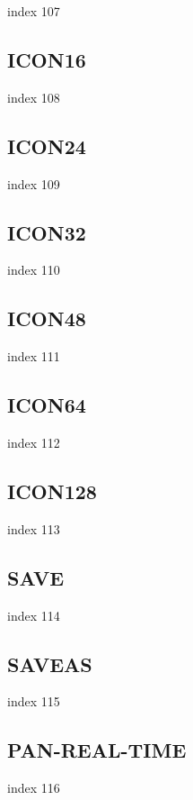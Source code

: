 \documentclass[a4paper]{report}
\begin{document}
{{{{{{{{{{{{{index 107

\subsection{ICON16}

index 108

\subsection{ICON24}

index 109

\subsection{ICON32}

index 110

\subsection{ICON48}

index 111

\subsection{ICON64}

index 112

\subsection{ICON128}

index 113

\subsection{SAVE}

index 114

\subsection{SAVEAS}

index 115

\subsection{PAN-REAL-TIME}

index 116

}}}}}}}}}}}}}
\end{document}
